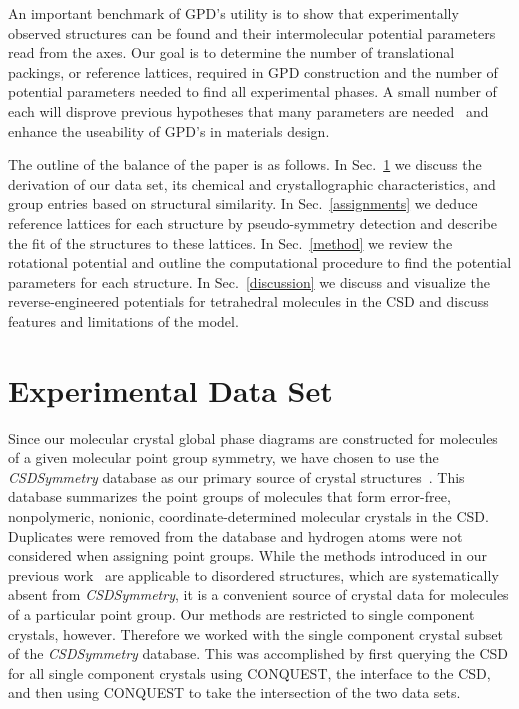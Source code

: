 \documentclass[preprint]{revtex4}              %
\begin{document}
An important benchmark of GPD's utility is to show that
experimentally observed structures can be found and their
intermolecular potential parameters read from the axes. Our goal is
to determine the number of translational packings, or reference
lattices, required in GPD construction and the number of potential
parameters needed to find all experimental phases.  A small number
of each will disprove previous hypotheses that many parameters are
needed~\cite{Briels80} and enhance the useability of GPD's in
materials design.

The outline of the balance of the paper is as follows. In
Sec.~\ref{Reference_Phases} we discuss the derivation of our data
set, its chemical and crystallographic characteristics, and group
entries based on structural similarity. In Sec.~\ref{assignments} we
deduce reference lattices for each structure by pseudo-symmetry
detection and describe the fit of the structures to these lattices.
In Sec.~\ref{method} we review the rotational potential and outline
the computational procedure to find the potential parameters for
each structure. In Sec.~\ref{discussion} we discuss and visualize
the reverse-engineered potentials for tetrahedral molecules in the
CSD and discuss features and limitations of the model.

\section{Experimental Data Set}
\label{Reference_Phases}

Since our molecular crystal global phase diagrams are constructed
for molecules of a given molecular point group symmetry, we have
chosen to use the \emph{CSDSymmetry} database as our primary source
of crystal structures~\cite{Yao02}. This database summarizes the
point groups of molecules that form error-free, nonpolymeric,
nonionic, coordinate-determined molecular crystals in the CSD.
Duplicates were removed from the database and hydrogen atoms were
not considered when assigning point groups. While the methods
introduced in our previous work~\cite{Mettes04} are applicable to
disordered structures, which are systematically absent from
\emph{CSDSymmetry}, it is a convenient source of crystal data for
molecules of a particular point group. Our methods are restricted to
single component crystals, however. Therefore we worked with the
single component crystal subset of the \emph{CSDSymmetry} database.
This was accomplished by first querying the CSD for all single
component crystals using {C\small ONQUEST}, the interface to the
CSD, and then using {C\small ONQUEST} to take the intersection of
the two data sets.
\end{document}

